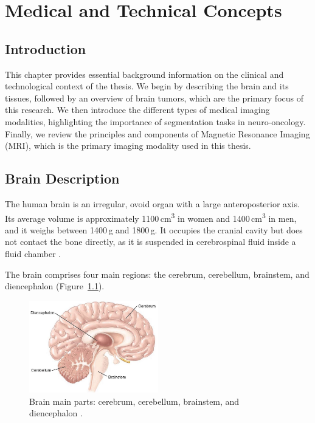 \chapter{Medical and Technical Concepts}

\section{Introduction}
This chapter provides essential background information on the clinical and technological context of the thesis. We begin by describing the brain and its tissues, followed by an overview of brain tumors, which are the primary focus of this research. We then introduce the different types of medical imaging modalities, highlighting the importance of segmentation tasks in neuro-oncology. Finally, we review the principles and components of Magnetic Resonance Imaging (MRI), which is the primary imaging modality used in this thesis.

\section{Brain Description}

The human brain is an irregular, ovoid organ with a large anteroposterior axis. Its average volume is approximately 1100\,cm\textsuperscript{3} in women and 1400\,cm\textsuperscript{3} in men, and it weighs between 1400\,g and 1800\,g. It occupies the cranial cavity but does not contact the bone directly, as it is suspended in cerebrospinal fluid inside a fluid chamber \cite{ref3}.

The brain comprises four main regions: the cerebrum, cerebellum, brainstem, and diencephalon (Figure~\ref{fig:brain-regions}).

\begin{figure}[ht]
      \centering
      \includegraphics[width=0.5\textwidth]{Images/Chapter0/brain.jpg}
      \caption{Brain main parts: cerebrum, cerebellum, brainstem, and diencephalon \cite{freudenrich2013visualizing}.}
      \label{fig:brain-regions}
\end{figure}

